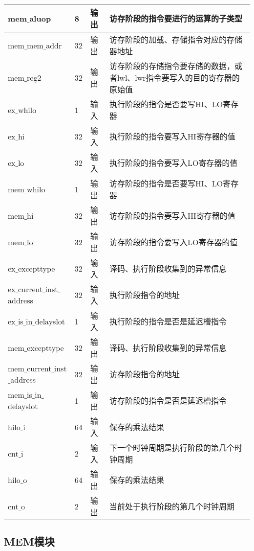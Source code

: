 \begin{table}[H]
\begin{tabular}{|l|l|l|l|}
		\hline
		mem$\_$aluop & 8 & 输出 & 访存阶段的指令要进行的运算的子类型 \\
		\hline
		mem$\_$mem$\_$addr & 32 & 输出 & 访存阶段的加载、存储指令对应的存储器地址 \\
		\hline
		mem$\_$reg2 & 32 & 输出 & 访存阶段的存储指令要存储的数据，或者lwl、lwr指令要写入的目的寄存器的原始值 \\
		\hline
		ex$\_$whilo & 1 & 输入 & 执行阶段的指令是否要写HI、LO寄存器 \\
		\hline
		ex$\_$hi & 32 & 输入 & 执行阶段的指令要写入HI寄存器的值 \\
		\hline
		ex$\_$lo & 32 & 输入 & 执行阶段的指令要写入LO寄存器的值 \\
		\hline
		mem$\_$whilo & 1 & 输出 & 访存阶段的指令是否要写HI、LO寄存器 \\
		\hline
		mem$\_$hi & 32 & 输出 & 访存阶段的指令要写入HI寄存器的值 \\
		\hline
		mem$\_$lo & 32 & 输出 & 访存阶段的指令要写入LO寄存器的值 \\
		\hline
		ex$\_$excepttype & 32 & 输入 & 译码、执行阶段收集到的异常信息 \\
		\hline
		ex$\_$current$\_$inst$\_$address & 32 & 输入 & 执行阶段指令的地址 \\
		\hline
		ex$\_$is$\_$in$\_$delayslot & 1 & 输入 & 执行阶段的指令是否是延迟槽指令 \\
		\hline
		mem$\_$excepttype & 32 & 输出 & 译码、执行阶段收集到的异常信息 \\
		\hline
		mem$\_$current$\_$inst$\_$address & 32 & 输出 & 访存阶段指令的地址 \\
		\hline
		mem$\_$is$\_$in$\_$delayslot & 1 & 输出 & 访存阶段的指令是否是延迟槽指令 \\
		\hline
		hilo$\_$i & 64 & 输入 & 保存的乘法结果 \\
		\hline
		cnt$\_$i & 2 & 输入 & 下一个时钟周期是执行阶段的第几个时钟周期 \\
		\hline
		hilo$\_$o & 64 & 输出 & 保存的乘法结果 \\
		\hline
		cnt$\_$o & 2 & 输出 & 当前处于执行阶段的第几个时钟周期 \\
		\hline
	\end{tabular}
\end{table}
\subsection{MEM模块}
